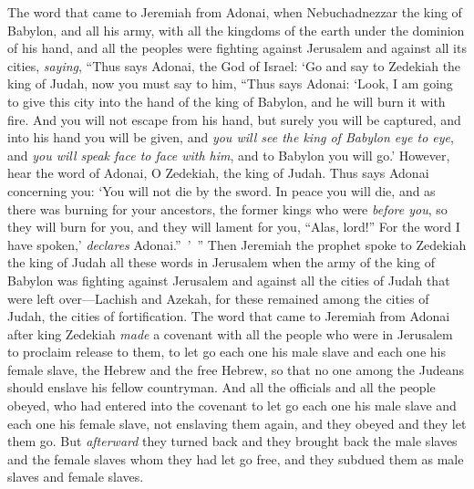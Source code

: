 \begin{biblechapter} %
 The word that came to Jeremiah from Adonai, when Nebuchadnezzar the king of Babylon, and all his army, with all the kingdoms of the earth under the dominion of his hand, and all the peoples were fighting against Jerusalem and against all its cities, \textit{saying},
\verse “Thus says Adonai, the God of Israel: ‘Go and say to Zedekiah the king of Judah, now you must say to him, “Thus says Adonai: ‘Look, I am going to give this city into the hand of the king of Babylon, and he will burn it with fire.
\verse And you will not escape from his hand, but surely you will be captured, and into his hand you will be given, and \textit{you will see the king of Babylon eye to eye}, and \textit{you will speak face to face with him}, and to Babylon you will go.’
\verse However, hear the word of Adonai, O Zedekiah, the king of Judah. Thus says Adonai concerning you: ‘You will not die by the sword.
\verse In peace you will die, and as there was burning for your ancestors, the former kings who were \textit{before you}, so they will burn for you, and they will lament for you, “Alas, lord!” For the word I have spoken,’ \textit{declares} Adonai.” ’ ”
\verse Then Jeremiah the prophet spoke to Zedekiah the king of Judah all these words in Jerusalem
\verse when the army of the king of Babylon was fighting against Jerusalem and against all the cities of Judah that were left over—Lachish and Azekah, for these remained among the cities of Judah, the cities of fortification.
 The word that came to Jeremiah from Adonai after king Zedekiah \textit{made} a covenant with all the people who were in Jerusalem to proclaim release to them,
\verse to let go each one his male slave and each one his female slave, the Hebrew and the free Hebrew, so that no one among the Judeans should enslave his fellow countryman.
\verse And all the officials and all the people obeyed, who had entered into the covenant to let go each one his male slave and each one his female slave, not enslaving them again, and they obeyed and they let them go.
\verse But \textit{afterward} they turned back and they brought back the male slaves and the female slaves whom they had let go free, and they subdued them as male slaves and female slaves.

\end{biblechapter}
